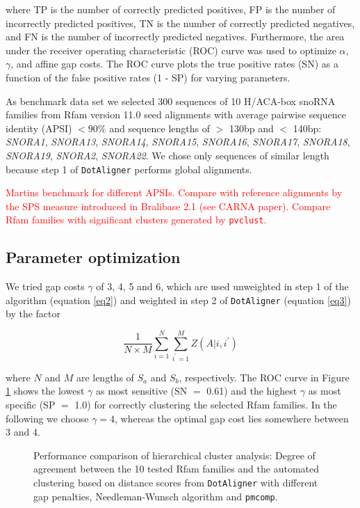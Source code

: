 \documentclass[a4paper,twoside]{article}
\newcommand\dotaligner{\texttt{DotAligner}}
\newcommand\pmcomp{\texttt{pmcomp}}
\newcommand\pvclust{\texttt{pvclust}}
\newcommand{\RED}[1]{\textcolor{red}{#1}}
\begin{document}
where TP is the number of correctly predicted positives, FP is the number of
incorrectly predicted positives, TN is the number of correctly predicted
negatives, and FN is the number of incorrectly predicted negatives.
Furthermore, the area under the receiver operating characteristic (ROC) curve
was used to optimize $\alpha$, $\gamma$, and affine gap costs. The ROC curve
plots the true positive rates (SN) as a function of the false positive rates (1
- SP) for varying parameters.

As benchmark data set we selected 300 sequences of 10 H/ACA-box snoRNA families
from Rfam version 11.0 seed alignments with average pairwise sequence identity
(APSI) $< 90\%$ and sequence lengths of $>$ 130bp and $<$ 140bp: \emph{SNORA1},
\emph{SNORA13}, \emph{SNORA14}, \emph{SNORA15}, \emph{SNORA16}, \emph{SNORA17},
\emph{SNORA18}, \emph{SNORA19}, \emph{SNORA2}, \emph{SNORA22}. We chose only
sequences of similar length because step 1 of \dotaligner{} performs global
alignments.

\RED{Martins benchmark for different APSIs. Compare with reference alignments by
the SPS measure introduced in Bralibase 2.1 (see CARNA paper). Compare Rfam
families with significant clusters generated by \pvclust.}


\subsection{Parameter optimization}

\noindent We tried gap costs $\gamma$ of 3, 4, 5 and 6, which are used
unweighted in step 1 of the algorithm (equation \ref{eq2}) and weighted in step
2 of \dotaligner{} (equation \ref{eq3}) by the factor 

\begin{equation}\label{eq6}
	\frac{1}{N \times M} \sum_{i=1}^{N} \sum_{i^\prime=1}^{M} Z(A|i,i^\prime)
\end{equation}

where $N$ and $M$ are lengths of $S_a$ and $S_b$, respectively. The ROC curve in
Figure \ref{fig:roc} shows the lowest $\gamma$ as most sensitive (SN $=$ 0.61)
and the highest $\gamma$ as most specific (SP $=$ 1.0) for correctly clustering
the selected Rfam families. In the following we choose $\gamma=4$, whereas the
optimal gap cost lies somewhere between 3 and 4.

\begin{figure}[!h]
  \centering
    {}
  \caption{Performance comparison of hierarchical cluster analysis: Degree of
  agreement between the 10 tested Rfam families and the automated clustering
  based on distance scores from \dotaligner{} with different gap penalties,
  Needleman-Wunsch algorithm and \pmcomp{}.}
  \label{fig:roc}
\end{figure}
\end{document}
